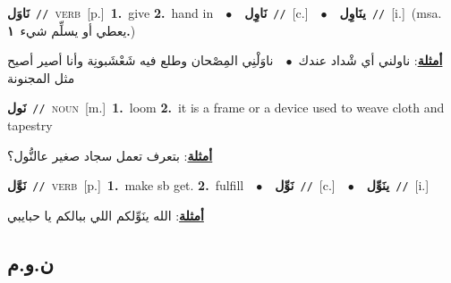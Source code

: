 \documentclass[10pt,a4paper,twoside]{article} %
\begin{document}
\begin{multicols}{2}
{\setlength\topsep{0pt}\textbf{\foreignlanguage{arabic}{نَاوَل}}\ {\color{gray}\texttt{//}\color{black}}\ \textsc{verb}\ [p.]\ \textbf{1.}~give  \textbf{2.}~hand in\ \ $\bullet$\ \ \setlength\topsep{0pt}\textbf{\foreignlanguage{arabic}{نَاوِل}}\ {\color{gray}\texttt{//}\color{black}}\ [c.]\ \ $\bullet$\ \ \setlength\topsep{0pt}\textbf{\foreignlanguage{arabic}{ينَاوِل}}\ {\color{gray}\texttt{//}\color{black}}\ [i.]\ \color{gray}(msa. \foreignlanguage{arabic}{يعطي أو يسلِّم شيء}~\foreignlanguage{arabic}{\textbf{١.}})\color{black}\  \begin{flushright}\color{gray}\foreignlanguage{arabic}{\textbf{\underline{\foreignlanguage{arabic}{أمثلة}}}: ناولني أي شْداد عندك\ $\bullet$\ \  ناوَلْنِي المِصْحان وطلع فيه شَعْشَبونِة وأنا أصير أصيح مثل المجنونة}\end{flushright}\color{black}} \vspace{2mm}

{\setlength\topsep{0pt}\textbf{\foreignlanguage{arabic}{نَول}}\ {\color{gray}\texttt{//}\color{black}}\ \textsc{noun}\ [m.]\ \textbf{1.}~loom  \textbf{2.}~it is a frame  or a device used to weave cloth and tapestry\  \begin{flushright}\color{gray}\foreignlanguage{arabic}{\textbf{\underline{\foreignlanguage{arabic}{أمثلة}}}: بتعرف تعمل سجاد صغير عالنُّول؟}\end{flushright}\color{black}} \vspace{2mm}

{\setlength\topsep{0pt}\textbf{\foreignlanguage{arabic}{نَوَّل}}\ {\color{gray}\texttt{//}\color{black}}\ \textsc{verb}\ [p.]\ \textbf{1.}~make sb get.  \textbf{2.}~fulfill\ \ $\bullet$\ \ \setlength\topsep{0pt}\textbf{\foreignlanguage{arabic}{نَوِّل}}\ {\color{gray}\texttt{//}\color{black}}\ [c.]\ \ $\bullet$\ \ \setlength\topsep{0pt}\textbf{\foreignlanguage{arabic}{ينَوِّل}}\ {\color{gray}\texttt{//}\color{black}}\ [i.]\  \begin{flushright}\color{gray}\foreignlanguage{arabic}{\textbf{\underline{\foreignlanguage{arabic}{أمثلة}}}: الله ينَوِّلكم اللي ببالكم يا حبايبي}\end{flushright}\color{black}} \vspace{2mm}

\vspace{-3mm}
\subsection*{\color{blue}\foreignlanguage{arabic}{ن.و.م}\color{blue}{}} 


\end{multicols}
\end{document}
